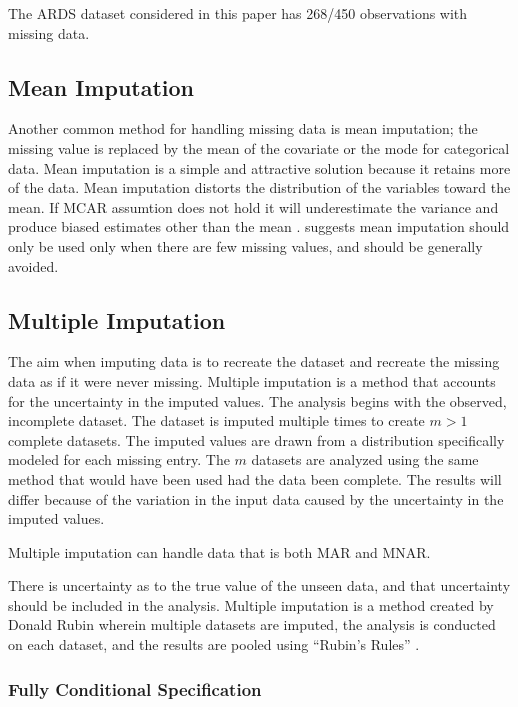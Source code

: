 \documentclass[12pt,]{article}
\begin{document}
The ARDS dataset considered in this paper has 268/450 observations with
missing data.

\subsection{Mean Imputation}\label{mean-imputation}

Another common method for handling missing data is mean imputation; the
missing value is replaced by the mean of the covariate or the mode for
categorical data. Mean imputation is a simple and attractive solution
because it retains more of the data. Mean imputation distorts the
distribution of the variables toward the mean. If MCAR assumtion does
not hold it will underestimate the variance and produce biased estimates
other than the mean \citep{van_buuren_flexible_2012}.
\citep{van_buuren_flexible_2012} suggests mean imputation should only be
used only when there are few missing values, and should be generally
avoided.

\subsection{Multiple Imputation}\label{multiple-imputation}

The aim when imputing data is to recreate the dataset and recreate the
missing data as if it were never missing. Multiple imputation is a
method that accounts for the uncertainty in the imputed values. The
analysis begins with the observed, incomplete dataset. The dataset is
imputed multiple times to create \(m>1\) complete datasets. The imputed
values are drawn from a distribution specifically modeled for each
missing entry. The \(m\) datasets are analyzed using the same method
that would have been used had the data been complete. The results will
differ because of the variation in the input data caused by the
uncertainty in the imputed values.

Multiple imputation can handle data that is both MAR and MNAR.

There is uncertainty as to the true value of the unseen data, and that
uncertainty should be included in the analysis. Multiple imputation is a
method created by Donald Rubin wherein multiple datasets are imputed,
the analysis is conducted on each dataset, and the results are pooled
using ``Rubin's Rules'' \citep{rubin_inference_1976}.

\subsubsection{Fully Conditional
Specification}\label{fully-conditional-specification}
\end{document}
